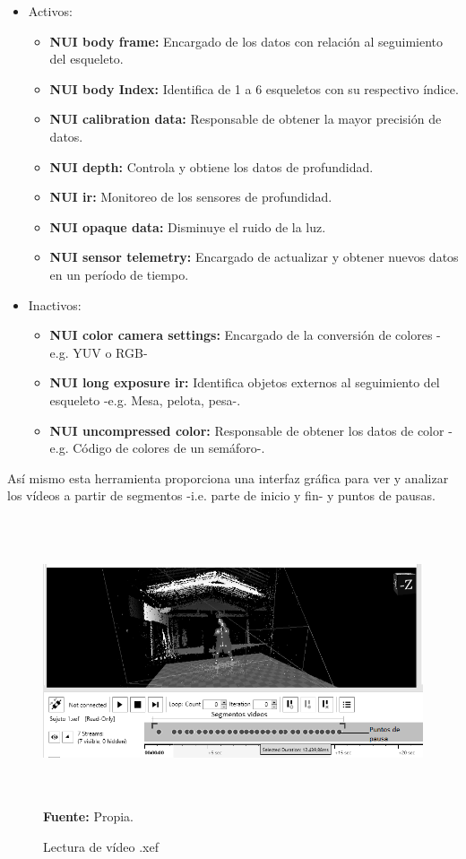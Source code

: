 \begin{itemize}
\item Activos:
\begin{itemize}
\item \textbf{NUI body frame:} Encargado de los datos con relaci\'on al seguimiento del esqueleto.
\item \textbf{NUI body Index:} Identifica de 1 a 6 esqueletos con su respectivo \'indice.
\item \textbf{NUI calibration data:} Responsable de obtener la mayor precisi\'on de datos.
\item \textbf{NUI depth:} Controla y obtiene los datos de profundidad.
\item \textbf{NUI ir:} Monitoreo de los sensores de profundidad.
\item \textbf{NUI opaque data:} Disminuye el ruido de la luz.
\item \textbf{NUI sensor telemetry:} Encargado de actualizar y obtener nuevos datos en un per\'iodo de tiempo.
\end{itemize}
\item Inactivos:
\begin{itemize}
\item \textbf{NUI color camera settings:} Encargado de la conversi\'on de colores -e.g. YUV o RGB-
\item \textbf{NUI long exposure ir:} Identifica  objetos externos al seguimiento del esqueleto -e.g. Mesa, pelota, pesa-.
\item \textbf{NUI uncompressed color:} Responsable de obtener los datos de color -e.g. C\'odigo de colores de un sem\'aforo-.
\end{itemize}
\end{itemize}
As\'i mismo esta herramienta proporciona una interfaz gr\'afica para ver y analizar los v\'ideos a partir de segmentos -i.e. parte de inicio y fin- y puntos de pausas.
\begin{figure}[H]
	\caption{Lectura de v\'ideo .xef }
	\label{fig:readVideoXEF}
	\centering
	\includegraphics[width=460px,height=320px]{graphics/readVideo.PNG} \\
	\textbf{Fuente:} Propia.
\end{figure} 
